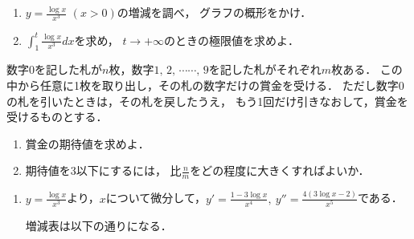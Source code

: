 \begin{problem}
  \begin{enumerate}
\item $\displaystyle y=\frac{\log x}{x^3}$ $(x>0)$の増減を調べ，
グラフの概形をかけ．
\item $\displaystyle\int_1^t\frac{\log x}{x^3}dx$を求め，
$t\to+\infty$のときの極限値を求めよ．
\end{enumerate}

数字0を記した札が$n$枚，数字$1, \, 2, \, \cdots\cdots, \, 9$を記した札がそれぞれ$m$枚ある．
この中から任意に1枚を取り出し，その札の数字だけの賞金を受ける．
ただし数字0の札を引いたときは，その札を戻したうえ，
もう1回だけ引きなおして，賞金を受けるものとする．
\begin{enumerate}
\item 賞金の期待値を求めよ．
\item 期待値を3以下にするには，
比$\displaystyle\frac{n}{m}$をどの程度に大きくすればよいか．
\end{enumerate}
\end{problem}

\begin{enumerate}
  \item $y = \frac{\log x}{x^3}$より，$x$について微分して，$y' = \frac{1-3\log x}{x^4},\ y'' = \frac{4(3\log x - 2)}{x^5}$である．

  増減表は以下の通りになる．


\end{enumerate}

